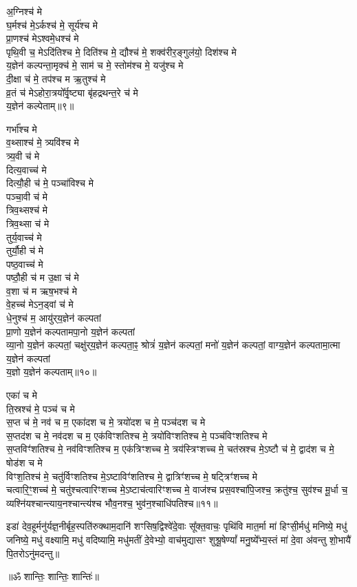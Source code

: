अ॒ग्निश्च॑ मे\\
घ॒र्मश्च॑ मे॒ऽर्कश्च॑ मे॒ सूर्य॑श्च मे\\
प्रा॒णश्च॑ मेऽश्वमे॒धश्च॑ मे\\
पृथि॒वी च॒ मेऽदि॑तिश्च मे॒ दिति॑श्च मे॒ द्यौश्च॑ मे॒ शक्व॑रीर॒ङ्गुल॑यो॒ दिश॑श्च मे\\
य॒ज्ञेन॑ कल्पन्ता॒मृक्च॑ मे॒ साम॑ च मे॒ स्तोम॑श्च मे॒ यजु॑श्च मे\\
दी॒क्षा च॑ मे॒ तप॑श्च म ऋ॒तुश्च॑ मे\\
व्र॒तं च॑ मेऽहोरा॒त्रयो᳚र्वृ॒ष्ट्या बृ॑हद्रथन्त॒रे च॑ मे\\
य॒ज्ञेन॑ कल्पेताम्॥९॥ 

गर्भा᳚श्च मे\\
व॒थ्साश्च॑ मे॒ त्र्यवि॑श्च मे\\
त्र्य॒वी च॑ मे\\
दित्य॒वाच्च॑ मे\\
दित्यौ॒ही च॑ मे॒ पञ्चा॑विश्च मे\\
पञ्चा॒वी च॑ मे\\
त्रिव॒थ्सश्च॑ मे\\
त्रिव॒थ्सा च॑ मे\\
तुर्य॒वाच्च॑ मे\\
तुर्यौ॒ही च॑ मे\\
पष्ठ॒वाच्च॑ मे\\
पष्ठौ॒ही च॑ म उ॒क्षा च॑ मे\\
व॒शा च॑ म ऋष॒भश्च॑ मे\\
वे॒हच्च॑ मेऽन॒ड्वां च॑ मे\\
धे॒नुश्च॑ म॒ आयु॑र्‌य॒ज्ञेन॑ कल्पतां\\
प्रा॒णो य॒ज्ञेन॑ कल्पतामपा॒नो य॒ज्ञेन॑ कल्पतां\\
व्या॒नो य॒ज्ञेन॑ कल्पतां॒ चक्षु॑र्‌य॒ज्ञेन॑ कल्पता॒ꣴ॒ श्रोत्रं॑ य॒ज्ञेन॑ कल्पतां॒ मनो॑ य॒ज्ञेन॑ कल्पतां॒ वाग्य॒ज्ञेन॑ कल्पतामा॒त्मा य॒ज्ञेन॑ कल्पतां\\
य॒ज्ञो य॒ज्ञेन॑ कल्पताम्॥१०॥ 

एका॑ च मे\\
ति॒स्रश्च॑ मे॒ पञ्च॑ च मे\\
स॒प्त च॑ मे॒ नव॑ च म॒ एका॑दश च मे॒ त्रयो॑दश च मे॒ पञ्च॑दश च मे\\
स॒प्तद॑श च मे॒ नव॑दश च म॒ एक॑विꣳशतिश्च मे॒ त्रयो॑विꣳशतिश्च मे॒ पञ्च॑विꣳशतिश्च मे\\
स॒प्तविꣳ॑शतिश्च मे॒ नव॑विꣳशतिश्च म॒ एक॑त्रिꣳशच्च मे॒ त्रय॑स्त्रिꣳशच्च मे॒ चत॑स्रश्च मे॒ऽष्टौ च॑ मे॒ द्वाद॑श च मे॒ षोड॑श च मे\\
विꣳश॒तिश्च॑ मे॒ चतु॑र्विꣳशतिश्च मे॒ऽष्टाविꣳ॑शतिश्च मे॒ द्वात्रिꣳ॑शच्च मे॒ षट्त्रिꣳ॑शच्च मे\\
चत्वारि॒ꣳ॒शच्च॑ मे॒ चतु॑श्चत्वारिꣳशच्च मे॒ऽष्टाच॑त्वारिꣳशच्च मे॒ वाज॑श्च प्रस॒वश्चा॑पि॒जश्च॒ क्रतु॑श्च॒ सुव॑श्च मू॒र्धा च॒ व्यश्नि॑यश्चान्त्याय॒नश्चान्त्य॑श्च भौव॒नश्च॒ भुव॑न॒श्चाधि॑पतिश्च॥११॥ 

इडा॑ देव॒हूर्मनु॑र्यज्ञ॒नीर्बृह॒स्पति॑रुक्थाम॒दानि॑ शꣳसिष॒द्विश्वे॑दे॒वाः सू᳚क्त॒वाचः॒ पृथि॑वि मात॒र्मा मा॑ हिꣳसी॒र्मधु॑ मनिष्ये॒ मधु॑ जनिष्ये॒ मधु॑ वक्ष्यामि॒ मधु॑ वदिष्यामि॒ मधु॑मतीं दे॒वेभ्यो॒ वाच॑मुद्यासꣳ शुश्रू॒षेण्यां᳚ मनु॒ष्ये᳚भ्य॒स्तं मा॑ दे॒वा अ॑वन्तु शो॒भायै॑ पि॒तरोऽनु॑मदन्तु॥ 

\centerline{॥ॐ शान्तिः॒ शान्तिः॒ शान्तिः॑॥}


